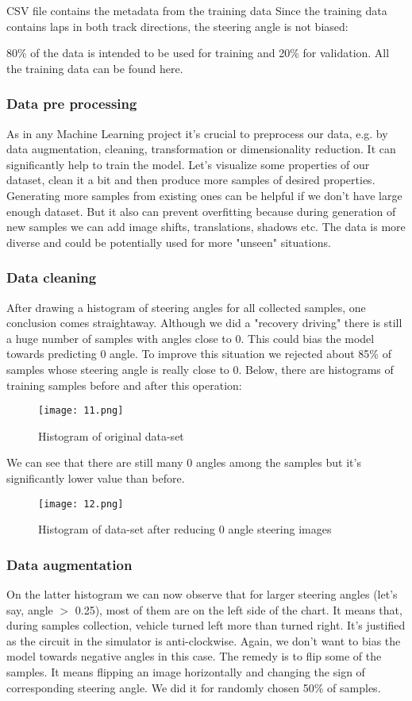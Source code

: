 CSV file contains the metadata from the training data
Since the training data contains laps in both track directions, the steering angle is not biased:

80\% of the data is intended to be used for training and 20\% for validation. All the training data can be found here.

\subsubsection{Data pre processing}
As in any Machine Learning project it's crucial to preprocess our data, e.g. by data augmentation, cleaning, transformation or dimensionality reduction. It can significantly help to train the model. Let's visualize some properties of our dataset, clean it a bit and then produce more samples of desired properties. Generating more samples from existing ones can be helpful if we don't have large enough dataset. But it also can prevent overfitting because during generation of new samples we can add image shifts, translations, shadows etc. The data is more diverse and could be potentially used for more "unseen" situations.

\subsubsection{Data cleaning}
After drawing a histogram of steering angles for all collected samples, one conclusion comes straightaway. Although we did a "recovery driving" there is still a huge number of samples with angles close to 0. This could bias the model towards predicting 0 angle. To improve this situation we rejected about 85\% of samples whose steering angle is really close to 0. Below, there are histograms of training samples before and after this operation:
\begin{figure}[H]
	\centering
	\texttt{[image: 11.png]}
	\caption{Histogram of original data-set}
\end{figure}
We can see that there are still many 0 angles among the samples but it's significantly lower value than before.
\begin{figure}[H]
	\centering
	\texttt{[image: 12.png]}
	\caption{Histogram of data-set after reducing 0 angle steering images}
\end{figure}

\subsubsection{Data augmentation}
On the latter histogram we can now observe that for larger steering angles (let's say, angle $>$ 0.25), most of them are on the left side of the chart. It means that, during samples collection, vehicle turned left more than turned right. It's justified as the circuit in the simulator is anti-clockwise. Again, we don't want to bias the model towards negative angles in this case. The remedy is to flip some of the samples. It means flipping an image horizontally and changing the sign of corresponding steering angle. We did it for randomly chosen 50\% of samples.

